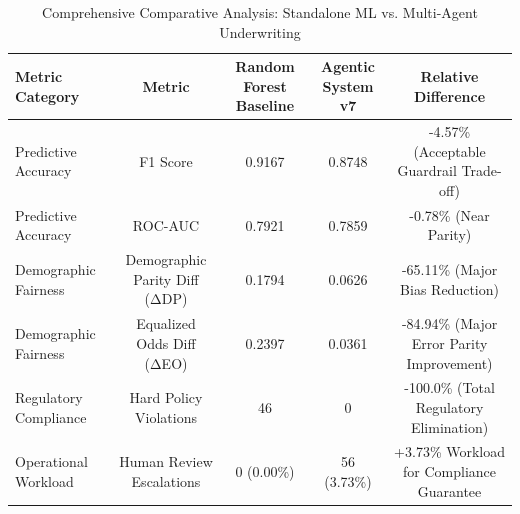 \begin{table}[htbp]
\centering
\caption{Comprehensive Comparative Analysis: Standalone ML vs. Multi-Agent Underwriting}
\label{tab:rf_vs_agentic}
\begin{tabular}{lcccc}
\hline
Metric Category & Metric & Random Forest Baseline & Agentic System v7 & Relative Difference \\
\hline
Predictive Accuracy & F1 Score & 0.9167 & 0.8748 & -4.57\% (Acceptable Guardrail Trade-off) \\
Predictive Accuracy & ROC-AUC & 0.7921 & 0.7859 & -0.78\% (Near Parity) \\
Demographic Fairness & Demographic Parity Diff (ΔDP) & 0.1794 & 0.0626 & -65.11\% (Major Bias Reduction) \\
Demographic Fairness & Equalized Odds Diff (ΔEO) & 0.2397 & 0.0361 & -84.94\% (Major Error Parity Improvement) \\
Regulatory Compliance & Hard Policy Violations & 46 & 0 & -100.0\% (Total Regulatory Elimination) \\
Operational Workload & Human Review Escalations & 0 (0.00\%) & 56 (3.73\%) & +3.73\% Workload for Compliance Guarantee \\
\hline
\end{tabular}
\end{table}
